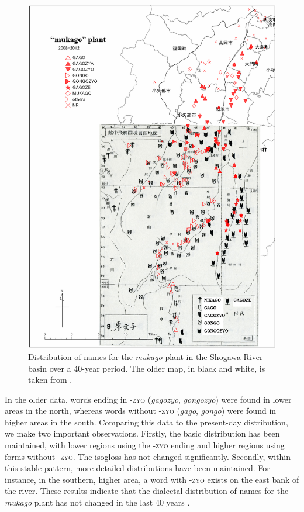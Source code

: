 \documentclass[output=paper]{LSP/langsci}
\begin{document}
\begin{figure}
\includegraphics[width=\textwidth]{illustrations/onishi_fig7}
\caption{Distribution of names for the \textit{mukago} plant in the Shogawa River basin over a 40-year period. The older map, in black and white, is taken from \citet{sanada_ecchu-hida_1976}.}
\label{fig:7}
\end{figure}

In the older data, words ending in \textsc{-zyo} (\textit{gagozyo}, \textit{gongozyo}) were found in lower areas in the north, whereas words without \textsc{-zyo} (\textit{gago}, \textit{gongo}) were found in higher areas in the south. Comparing this data to the present-day distribution, we make two important observations. Firstly, the basic distribution has been maintained, with lower regions using the \textsc{-zyo} ending and higher regions using forms without \textsc{-zyo}. The isogloss has not changed significantly. Secondly, within this stable pattern, more detailed distributions have been maintained. For instance, in the southern, higher area, a word with \textsc{-zyo} exists on the east bank of the river. These results indicate that the dialectal distribution of names for the \textit{mukago} plant has not changed in the last 40 years \citep{onishi_relationship_inprint}.
\end{document}
